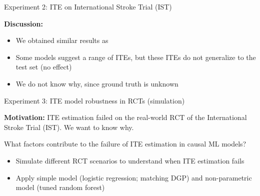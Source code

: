 \documentclass[onlytextwidth,english]{beamer}\usepackage[]{graphicx}\usepackage[]{xcolor}
\begin{document}
\begin{frame}{Experiment 2: ITE on International Stroke Trial (IST)}

\textbf{Discussion:}

\begin{itemize}
    \item We obtained similar results as \citet{chen2025}
    \item Some models suggest a range of ITEs, but these ITEs do not generalize to the test set (no effect)
    \item We do not know why, since ground truth is unknown
\end{itemize}

\end{frame}



% 
% 
% 
% 
% 
% 
% 
% 
% 
% 
% 
% 
% 
% 
% 
% 
% 
% 
% 
% 
% 
% 
% 
% 
% 
% 
% 
% 
% 
% 
% 
% 
% 
% 
% 
% 
% 
% 
% 
% 
% 
% 



\begin{frame}{Experiment 3:  ITE model robustness in RCTs (simulation)}

\textbf{Motivation:} ITE estimation failed on the real-world RCT of the International Stroke Trial (IST). We want to know why.


 What factors contribute to the failure of ITE estimation in causal ML models? %

\begin{itemize}
    \item Simulate different RCT scenarios to understand when ITE estimation fails
    \item Apply simple model (logistic regression; matching DGP) and non-parametric model (tuned random forest)
\end{itemize}


\end{frame}
\end{document}
